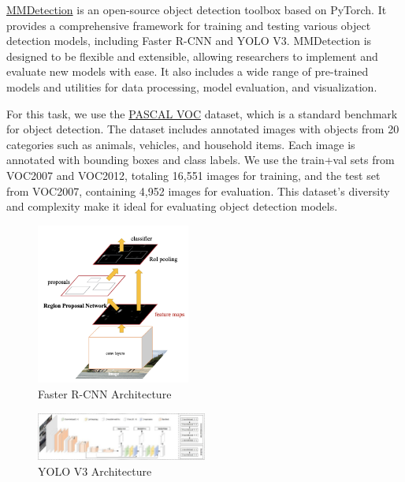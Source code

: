 \documentclass[UTF8]{ctexart}
\begin{document}
\href{https://github.com/open-mmlab/mmdetection}{MMDetection} is an open-source object detection toolbox based on PyTorch. 
It provides a comprehensive framework for training and testing various object detection models, including Faster R-CNN and YOLO V3. MMDetection is designed to be flexible and extensible, allowing researchers to implement and evaluate new models with ease. It also includes a wide range of pre-trained models and utilities for data processing, model evaluation, and visualization.

For this task, we use the \href{http://host.robots.ox.ac.uk/pascal/VOC/}{PASCAL VOC} dataset, which is a standard benchmark for object detection. 
The dataset includes annotated images with objects from 20 categories such as animals, vehicles, and household items. Each image is annotated with bounding boxes and class labels.
We use the train+val sets from VOC2007 and VOC2012, totaling 16,551 images for training, and the test set from VOC2007, containing 4,952 images for evaluation.
This dataset's diversity and complexity make it ideal for evaluating object detection models.

\begin{figure}[H]
    \centering
    \includegraphics[width=0.45\textwidth]{./figs/faster-rcnn.png}
    \caption{Faster R-CNN Architecture}
    \label{fig:faster_rcnn}
\end{figure}

\begin{figure}[H]
    \centering
    \includegraphics[width=0.5\textwidth]{./figs/YOLOv3.jpg}
    \caption{YOLO V3 Architecture}
    \label{fig:yolo}
\end{figure}
\end{document}
